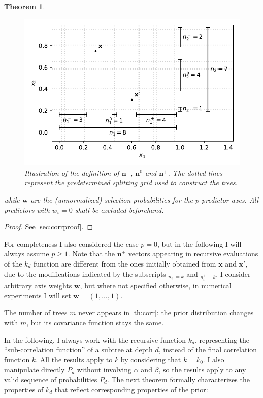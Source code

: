 \documentclass[a4paper]{article}
\newtheorem{theorem}{Theorem}
\theoremstyle{definition}
\begin{document}
\begin{theorem}
        \begin{figure}
            \centering\includegraphics[width=65ex]{figcounts}
            \caption{\label{fig:counts} Illustration of the definition of $\mathbf n^-$, $\mathbf n^0$ and $\mathbf n^+$. The dotted lines represent the predetermined splitting grid used to construct the trees.}
        \end{figure}
        while $\mathbf w$ are the (unnormalized) selection probabilities for the $p$ predictor axes. All predictors with $w_i = 0$ shall be excluded beforehand.
    \end{theorem}

    \begin{proof}
        See \autoref{sec:corrproof}.
    \end{proof}

    For completeness I also considered the case $p = 0$, but in the following I will always assume $p \ge 1$. Note that the $\mathbf n^\pm$ vectors appearing in recursive evaluations of the $k_d$ function are different from the ones initially obtained from $\mathbf x$ and $\mathbf x'$, due to the modifications indicated by the subscripts ${}_{n^-_i=k}$ and ${}_{n^+_i=k}$. I consider arbitrary axis weights $\mathbf w$, but where not specified otherwise, in numerical experiments I will set $\mathbf w = (1, \ldots, 1)$.

    The number of trees $m$ never appears in \autoref{th:corr}: the prior distribution changes with $m$, but its covariance function stays the same.

    In the following, I always work with the recursive function $k_d$, representing the ``sub-correlation function'' of a subtree at depth $d$, instead of the final correlation function $k$. All the results apply to $k$ by considering that $k=k_0$. I also manipulate directly $P_d$ without involving $\alpha$ and $\beta$, so the results apply to any valid sequence of probabilities $P_d$. The next theorem formally characterizes the properties of $k_d$ that reflect corresponding properties of the prior:
\end{document}
